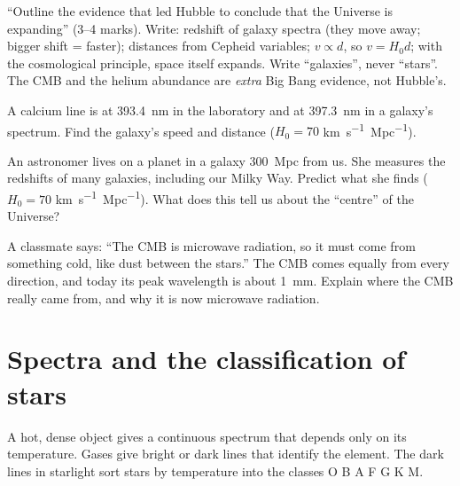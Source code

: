 \begin{examtip}
``Outline the evidence that led Hubble to conclude that the Universe is expanding''
(3--4 marks). Write: redshift of galaxy spectra (they move away; bigger shift = faster);
distances from Cepheid variables; $v \propto d$, so $v = H_0 d$; with the cosmological
principle, space itself expands. Write ``galaxies'', never ``stars''. The CMB and the
helium abundance are \emph{extra} Big Bang evidence, not Hubble's.
\end{examtip}

\begin{quickcheck}
  \item A calcium line is at \qty{393.4}{nm} in the laboratory and at \qty{397.3}{nm} in a
        galaxy's spectrum. Find the galaxy's speed and distance ($H_0 = 70$
        \si{km.s^{-1}.Mpc^{-1}}).
  \item An astronomer lives on a planet in a galaxy \qty{300}{Mpc} from us. She measures
        the redshifts of many galaxies, including our Milky Way. Predict what she finds
        ($H_0 = 70$ \si{km.s^{-1}.Mpc^{-1}}). What does this tell us about the
        ``centre'' of the Universe?
  \item A classmate says: ``The CMB is microwave radiation, so it must come from
        something cold, like dust between the stars.'' The CMB comes equally from every
        direction, and today its peak wavelength is about \qty{1}{mm}. Explain where the
        CMB really came from, and why it is now microwave radiation.
\end{quickcheck}

\section{Spectra and the classification of stars}\label{ch1:sec:spectra}

\begin{bigidea}
A hot, dense object gives a continuous spectrum that depends only on its temperature.
Gases give bright or dark lines that identify the element. The dark lines in starlight
sort stars by temperature into the classes O B A F G K M.
\end{bigidea}

\begin{keywords}
\end{keywords}

